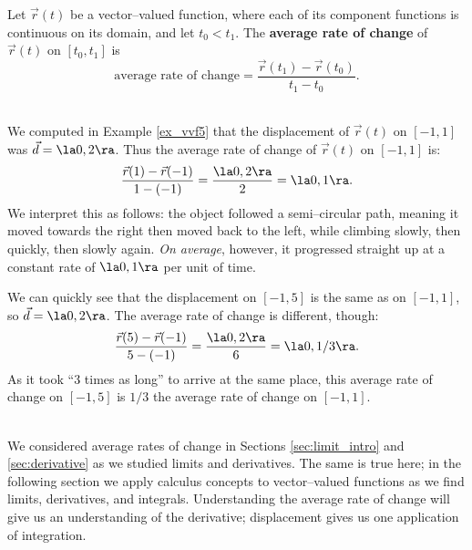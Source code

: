 {Let $\vec r(t)$ be a vector--valued function, where each of its component functions is continuous on its domain, and let $t_0<t_1$. The \textbf{average rate of change} of $\vec r(t)$ on $[t_0,t_1]$ is
$$\text{average rate of change} = \frac{\vec r(t_1) - \vec r(t_0)}{t_1-t_0}.$$
}\\

{We computed in Example \ref{ex_vvf5} that the displacement of $\vec r(t)$ on $[-1,1]$ was $\vec d = \la 0,2\ra$. Thus the average rate of change of $\vec r(t)$ on $[-1,1]$ is:
$$\frac{\vec r(1) -\vec r(-1)}{1-(-1)} = \frac{\la 0,2\ra}{2} = \la 0,1\ra.$$
We interpret this as follows: the object followed a semi--circular path, meaning it moved towards the right then moved back to the left, while climbing slowly, then quickly, then slowly again. \emph{On average}, however, it progressed straight up at a constant rate of $\la 0,1\ra$ per unit of time.

We can quickly see that the displacement on $[-1,5]$ is the same as on $[-1,1]$, so $\vec d = \la 0,2\ra$. The average rate of change is different, though:
$$\frac{\vec r(5)-\vec r(-1)}{5-(-1)} = \frac{\la 0,2\ra}{6} = \la 0,1/3\ra.$$
As it took ``3 times as long'' to arrive at the same place, this average rate of change on $[-1,5]$ is $1/3$ the average rate of change on $[-1,1]$.
}\\

We considered average rates of change in Sections \ref{sec:limit_intro} and \ref{sec:derivative} as we studied limits and derivatives. The same is true here; in the following section we apply calculus concepts to vector--valued functions as we find limits, derivatives, and integrals. Understanding the average rate of change will give us an understanding of the derivative; displacement gives us one application of integration.


